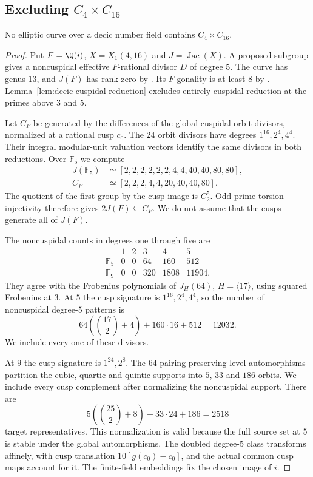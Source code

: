 \subsection{Excluding \texorpdfstring{$C_4\times C_{16}$}{C4 x C16}}
\begin{proposition}\label{prop:decic416}
No elliptic curve over a decic number field contains $C_4\times C_{16}$.
\end{proposition}
\begin{proof}
Put $F=\Q(i)$, $X=X_1(4,16)$ and $J=\operatorname{Jac}(X)$.
A proposed subgroup gives a noncuspidal effective $F$-rational
divisor $D$ of degree $5$. The curve has genus $13$, and
$J(F)$ has rank zero by \cite[Theorem~4.1]{DS}.
Its $F$-gonality is at least $8$ by \cite[Table~1]{NV}.
Lemma~\ref{lem:decic-cuspidal-reduction} excludes entirely cuspidal
reduction at the primes above $3$ and $5$.

Let $C_F$ be generated by the differences of the global cuspidal
orbit divisors, normalized at a rational cusp $c_0$.
The $24$ orbit divisors have degrees $1^{16},2^4,4^4$.
Their integral modular-unit valuation vectors identify the same
divisors in both reductions. Over $\mathbb F_5$ we compute
\[
\begin{aligned}
 J(\mathbb F_5)&\simeq[2,2,2,2,2,2,4,4,40,40,80,80],\\
 C_F&\simeq[2,2,2,4,4,20,40,40,80].
\end{aligned}
\]
The quotient of the first group by the cusp image is $C_2^5$.
Odd-prime torsion injectivity therefore gives $2J(F)\subseteq C_F$.
We do not assume that the cusps generate all of $J(F)$.

The noncuspidal counts in degrees one through five are
\[
\begin{array}{c|rrrrr}
 &1&2&3&4&5\\\hline
 \mathbb F_5&0&0&64&160&512\\
 \mathbb F_9&0&0&320&1808&11904.
\end{array}
\]
They agree with the Frobenius polynomials of $J_H(64)$,
$H=\langle17\rangle$, using squared Frobenius at $3$.
At $5$ the cusp signature is $1^{16},2^4,4^4$, so the number of
noncuspidal degree-$5$ patterns is
\[
 64\left(\binom{17}{2}+4\right)+160\cdot16+512=12032.
\]
We include every one of these divisors.

At $9$ the cusp signature is $1^{24},2^8$.
The $64$ pairing-preserving level automorphisms partition the
cubic, quartic and quintic supports into $5$, $33$ and $186$ orbits.
We include every cusp complement after normalizing the noncuspidal
support. There are
\[
 5\left(\binom{25}{2}+8\right)+33\cdot24+186=2518
\]
target representatives.
This normalization is valid because the full source set at $5$
is stable under the global automorphisms. The doubled degree-$5$
class transforms affinely, with cusp translation
$10[g(c_0)-c_0]$, and the actual common cusp maps account for it.
The finite-field embeddings fix the chosen image of $i$.


\end{proof}
